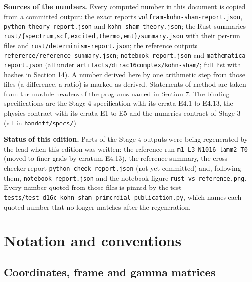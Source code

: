\documentclass[11pt]{article}
\begin{document}
\textbf{Sources of the numbers.} Every computed number in this document is copied from a committed output: the exact reports \texttt{wolfram-\allowbreak{}kohn-sha\allowbreak{}m-report\allowbreak{}.json}, \texttt{python-t\allowbreak{}heory-re\allowbreak{}port.jso\allowbreak{}n} and \texttt{kohn-sha\allowbreak{}m-theory\allowbreak{}.json}; the Rust summaries \texttt{rust/\{sp\allowbreak{}ectrum,s\allowbreak{}cf,excit\allowbreak{}ed,therm\allowbreak{}o,emt\}/s\allowbreak{}ummary.j\allowbreak{}son} with their per-run files and \texttt{rust/det\allowbreak{}erminism\allowbreak{}-report.\allowbreak{}json}; the reference outputs \texttt{referenc\allowbreak{}e/refere\allowbreak{}nce-summ\allowbreak{}ary.json}; \texttt{notebook\allowbreak{}-report.\allowbreak{}json} and \texttt{mathemat\allowbreak{}ica-repo\allowbreak{}rt.json} (all under \texttt{artifact\allowbreak{}s/dirac1\allowbreak{}6complex\allowbreak{}/kohn-sh\allowbreak{}am/}; full list with hashes in Section 14). A number derived here by one arithmetic step from those files (a difference, a ratio) is marked as derived. Statements of method are taken from the module headers of the programs named in Section 7. The binding specifications are the Stage-4 specification with its errata E4.1 to E4.13, the physics contract with its errata E1 to E5 and the numerics contract of Stage 3 (all in \texttt{handoff/\allowbreak{}specs/}).

\textbf{Status of this edition.} Parts of the Stage-4 outputs were being regenerated by the lead when this edition was written: the reference run \texttt{m1\_L3\_N1\allowbreak{}016\_lamm\allowbreak{}2\_T0} (moved to finer grids by erratum E4.13), the reference summary, the cross-checker report \texttt{python-c\allowbreak{}heck-rep\allowbreak{}ort.json} (not yet committed) and, following them, \texttt{notebook\allowbreak{}-report.\allowbreak{}json} and the notebook figure \texttt{rust\_vs\_\allowbreak{}referenc\allowbreak{}e.png}. Every number quoted from those files is pinned by the test \texttt{tests/te\allowbreak{}st\_d16c\_\allowbreak{}kohn\_sha\allowbreak{}m\_primor\allowbreak{}dial\_pub\allowbreak{}lication\allowbreak{}.py}, which names each quoted number that no longer matches after the regeneration.

\section{Notation and conventions}

\subsection{Coordinates, frame and gamma matrices}
\end{document}
